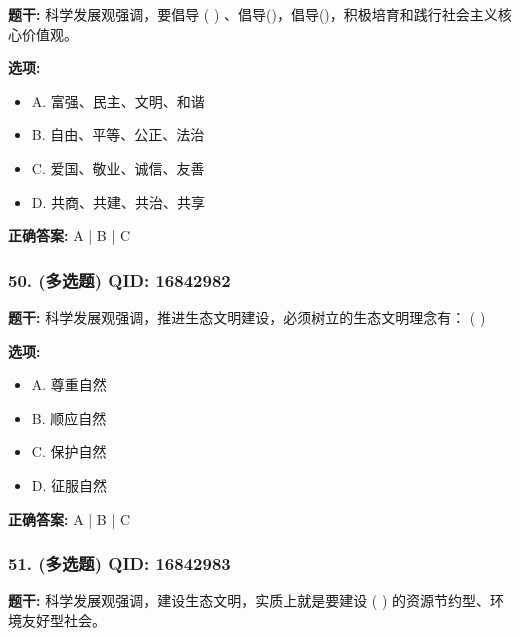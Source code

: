 \documentclass[12pt,UTF8]{ctexart}
\begin{document}
\textbf{题干:}
科学发展观强调，要倡导 ( ) 、倡导()，倡导()，积极培育和践行社会主义核心价值观。

\textbf{选项:}
\begin{itemize}[leftmargin=*]

  \item A. 富强、民主、文明、和谐

  \item B. 自由、平等、公正、法治

  \item C. 爱国、敬业、诚信、友善

  \item D. 共商、共建、共治、共享

\end{itemize}

\textbf{正确答案:}
A | B | C

\vspace{0.3em}\hrulefill\vspace{0.7em}

\subsubsection*{50. (多选题) \small QID: 16842982}

\textbf{题干:}
科学发展观强调，推进生态文明建设，必须树立的生态文明理念有： ( )

\textbf{选项:}
\begin{itemize}[leftmargin=*]

  \item A. 尊重自然

  \item B. 顺应自然

  \item C. 保护自然

  \item D. 征服自然

\end{itemize}

\textbf{正确答案:}
A | B | C

\vspace{0.3em}\hrulefill\vspace{0.7em}

\subsubsection*{51. (多选题) \small QID: 16842983}

\textbf{题干:}
科学发展观强调，建设生态文明，实质上就是要建设 ( ) 的资源节约型、环境友好型社会。
\end{document}
